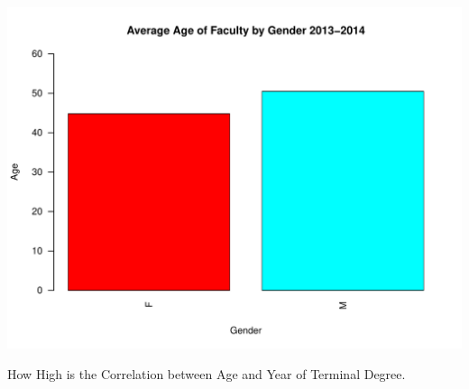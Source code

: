 \documentclass[12pt,a4paper]{article}\usepackage[]{graphicx}\usepackage[]{color}
\makeatletter
\def\maxwidth{ %
  \ifdim\Gin@nat@width>\linewidth
    \linewidth
  \else
    \Gin@nat@width
  \fi
}
\newenvironment{knitrout}{}{} %
\theoremstyle{definition}
\makeatother
\begin{document}
\begin{knitrout}
\includegraphics[width=\maxwidth]{figure/unnamed-chunk-11-10} 

\end{knitrout}

\bigskip
How High is the Correlation between Age and Year of Terminal Degree.
\end{document}
